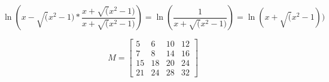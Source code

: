 \documentclass[10pt]{book}
\begin{document}
\begin{mdSnippets}
\begin{mdDisplaySnippet}
\end{mdDisplaySnippet}%
\begin{mdDisplaySnippet}[d40b86167f0d15b60a4bb755bb53b40c]%
\begin{mdDiv}[class={mathdisplay,math-display},color={},math-needpdf={}]%
\[%
\ln \left( x-\sqrt(x^2 - 1) * \frac{x+\sqrt(x^2 - 1)}{x+\sqrt(x^2 - 1)}\right) = \ln \left(\frac{1}{x+\sqrt(x^2 - 1)}\right) = \ln(x + \sqrt(x^2 - 1))
\]%
\end{mdDiv}%

\end{mdDisplaySnippet}%
\begin{mdInlineSnippet}[aa55e29cc3677637a8a354fe7a4bab88]%
\end{mdInlineSnippet}%
\begin{mdDisplaySnippet}[318d24ca7660dbaedbdfdf97ab781662]%
\begin{mdDiv}[class={mathdisplay,math-display},color={},math-needpdf={}]%
\[%
M = 
\begin{bmatrix}
   5  & 6  & 10 & 12 \\
   7  & 8  & 14 & 16 \\
   15 & 18 & 20 & 24 \\
   21 & 24 & 28 & 32
\end{bmatrix}
\]%
\end{mdDiv}%


\end{mdDisplaySnippet}
\end{mdSnippets}
\end{document}
